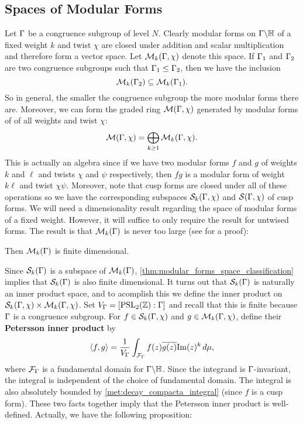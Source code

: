     \subsection*{Spaces of Modular Forms}
      Let $\Gamma$ be a congruence subgroup of level $N$. Clearly modular forms on $\Gamma\backslash\mathbb{H}$ of a fixed weight $k$ and twist $\chi$ are closed under addition and scalar multiplication and therefore form a vector space. Let $\mathcal{M}_{k}(\Gamma,\chi)$ denote this space. If $\Gamma_{1}$ and $\Gamma_{2}$ are two congruence subgroups such that $\Gamma_{1} \le \Gamma_{2}$, then we have the inclusion
      \[
        \mathcal{M}_{k}(\Gamma_{2}) \subseteq \mathcal{M}_{k}(\Gamma_{1}).
      \]
      So in general, the smaller the congruence subgroup the more modular forms there are. Moreover, we can form the graded ring $\mathcal{M}(\Gamma,\chi)$ generated by modular forms of of all weights and twist $\chi$:
      \[
        \mathcal{M}(\Gamma,\chi) = \bigoplus_{k \ge 1}\mathcal{M}_{k}(\Gamma,\chi).
      \]
      This is actually an algebra since if we have two modular forms $f$ and $g$ of weights $k$ and $\ell$ and twists $\chi$ and $\psi$ respectively, then $fg$ is a modular form of weight $k\ell$ and twist $\chi\psi$. Moreover, note that cusp forms are closed under all of these operations so we have the corresponding subspaces $\mathcal{S}_{k}(\Gamma,\chi)$ and $\mathcal{S}(\Gamma,\chi)$ of cusp forms. We will need a dimensionality result regarding the space of modular forms of a fixed weight. However, it will suffice to only require the result for untwised forms. The result is that $\mathcal{M}_{k}(\Gamma)$ is never too large (see \cite{diamond2005first} for a proof):

      \begin{theorem}\label{thm:modular_forms_space_classification}
        Then $\mathcal{M}_{k}(\Gamma)$ is finite dimensional.
      \end{theorem}

      Since $\mathcal{S}_{k}(\Gamma)$ is a subspace of $\mathcal{M}_{k}(\Gamma)$, \cref{thm:modular_forms_space_classification} implies that $\mathcal{S}_{k}(\Gamma)$ is also finite dimensional. It turns out that $\mathcal{S}_{k}(\Gamma)$ is naturally an inner product space, and to acomplish this we define the inner product on $\mathcal{S}_{k}(\Gamma,\chi) \times \mathcal{M}_{k}(\Gamma,\chi)$. Set $V_{\Gamma} = [\mathrm{PSL}_{2}(\mathbb{Z}):\Gamma]$ and recall that this is finite because $\Gamma$ is a congruence subgroup. For $f \in \mathcal{S}_{k}(\Gamma,\chi)$ and $g \in \mathcal{M}_{k}(\Gamma,\chi)$, define their \textbf{Petersson inner product} by
      \[
        \langle f,g\rangle = \frac{1}{V_{\Gamma}}\int_{\mathcal{F}_{\Gamma}}f(z)\overline{g(z)}\mathrm{Im}(z)^{k}\,d\mu,
      \]
      where $\mathcal{F}_{\Gamma}$ is a fundamental domain for $\Gamma\backslash\mathbb{H}$. Since the integrand is $\Gamma$-invariant, the integral is independent of the choice of fundamental domain. The integral is also absolutely bounded by \cref{met:decay_compacta_integral} (since $f$ is a cusp form). These two facts together imply that the Petersson inner product is well-defined. Actually, we have the following proposition:


